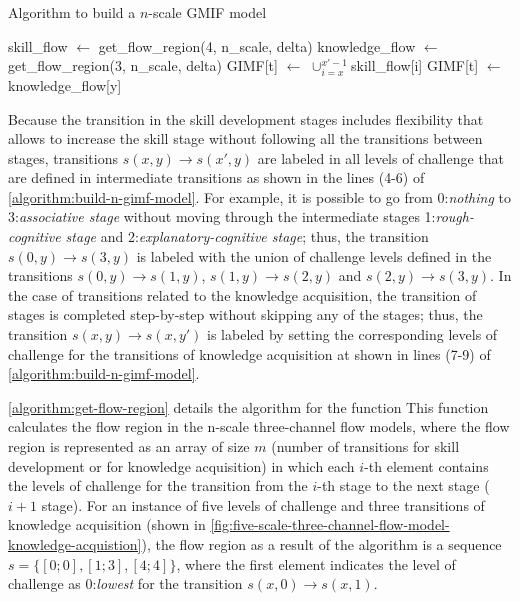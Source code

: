 \begin{algoritmo}
\caption{Algorithm to build a $n$-scale GMIF model}
\label{algorithm:build-n-gimf-model}
\begin{algorithmic}[1]\small
{}
  \State skill\_flow $\gets$ get\_flow\_region(4, n\_scale, delta)
  \State knowledge\_flow $\gets$ get\_flow\_region(3, n\_scale, delta)
    \State GIMF[t] $\gets$ $\cup_{i=x}^{x'-1}$skill\_flow[i]
  \EndFor
    \State GIMF[t] $\gets$  knowledge\_flow[y]
  \EndFor
\EndProcedure
\end{algorithmic}
\end{algoritmo}

Because the transition in the skill development stages includes flexibility that allows to increase the skill stage without following all the transitions between stages, transitions $s(x,y) \to s(x',y)$ are labeled in all levels of challenge that are defined in intermediate transitions as shown in the lines (4-6) of \autoref{algorithm:build-n-gimf-model}. For example, it is possible to go from 0:\emph{nothing} to 3:\emph{associative stage} without moving through the intermediate stages 1:\emph{rough-cognitive stage} and 2:\emph{explanatory-cognitive stage}; thus, the transition $s(0,y) \to s(3,y)$ is labeled with the union of challenge levels defined in the transitions $s(0,y) \to s(1,y)$, $s(1,y) \to s(2,y)$ and $s(2,y) \to s(3,y)$. In the case of transitions related to the knowledge acquisition, the transition of stages is completed step-by-step without skipping any of the stages; thus, the transition $s(x,y) \to s(x,y')$ is labeled by setting the corresponding levels of challenge for the transitions of knowledge acquisition at shown in lines (7-9) of \autoref{algorithm:build-n-gimf-model}.

\autoref{algorithm:get-flow-region} details the algorithm for the function  This function calculates the flow region in the n-scale three-channel flow models, where the flow region is represented as an array of size $m$ (number of transitions for skill development or for knowledge acquisition) in which each $i$-th element contains the levels of challenge for the transition from the $i$-th stage to the next stage ($i+1$ stage). For an instance of five levels of challenge and three transitions of knowledge acquisition (shown in \autoref{fig:five-scale-three-channel-flow-model-knowledge-acquistion}), the flow region as a result of the algorithm is a sequence $s = \{[0;0], [1;3], [4;4]\}$, where the first element \aspas{$[0;0]$} indicates the level of challenge as 0:\emph{lowest} for the transition $s(x,0) \to s(x,1)$.


